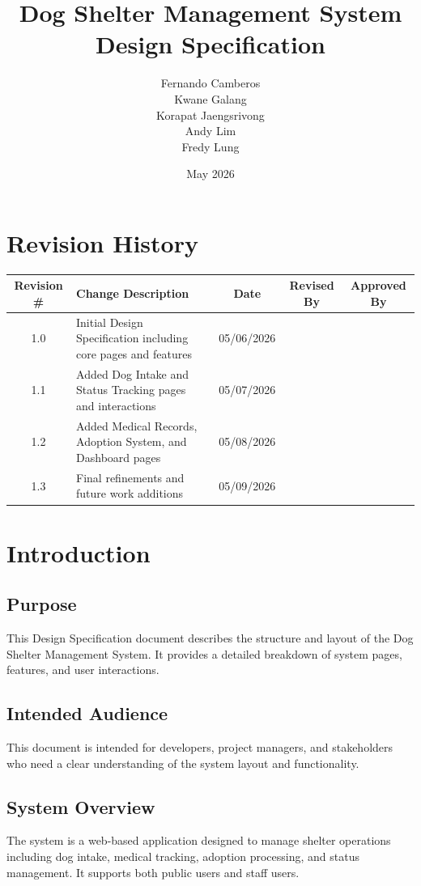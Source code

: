 \documentclass[12pt]{article}
\title{Dog Shelter Management System\\Design Specification}
\author{
Fernando Camberos \\
Kwane Galang \\
Korapat Jaengsrivong \\
Andy Lim \\
Fredy Lung
}
\date{May 2026}
\begin{document}
\maketitle

\tableofcontents
\newpage

\section*{Revision History}
\begin{longtable}{|c|p{5cm}|c|c|c|}
\hline
\textbf{Revision \#} & \textbf{Change Description} & \textbf{Date} & \textbf{Revised By} & \textbf{Approved By} \\
\hline
1.0 & Initial Design Specification including core pages and features & 05/06/2026 & & \\
\hline
1.1 & Added Dog Intake and Status Tracking pages and interactions & 05/07/2026 & & \\
\hline
1.2 & Added Medical Records, Adoption System, and Dashboard pages & 05/08/2026 & & \\
\hline
1.3 & Final refinements and future work additions & 05/09/2026 & & \\
\hline
\end{longtable}

\newpage

\section{Introduction}

\subsection{Purpose}
This Design Specification document describes the structure and layout of the Dog Shelter Management System. It provides a detailed breakdown of system pages, features, and user interactions.

\subsection{Intended Audience}
This document is intended for developers, project managers, and stakeholders who need a clear understanding of the system layout and functionality.

\subsection{System Overview}
The system is a web-based application designed to manage shelter operations including dog intake, medical tracking, adoption processing, and status management. It supports both public users and staff users.
\end{document}
